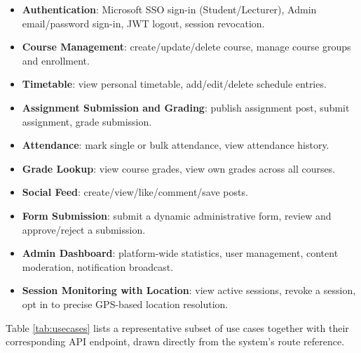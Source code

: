 \documentclass[12pt,a4paper]{report}
\begin{document}
\begin{itemize}
\item \textbf{Authentication}: Microsoft SSO sign-in (Student/Lecturer),
Admin email/password sign-in, JWT logout, session revocation.
\item \textbf{Course Management}: create/update/delete course, manage
course groups and enrollment.
\item \textbf{Timetable}: view personal timetable, add/edit/delete
schedule entries.
\item \textbf{Assignment Submission and Grading}: publish assignment
post, submit assignment, grade submission.
\item \textbf{Attendance}: mark single or bulk attendance, view
attendance history.
\item \textbf{Grade Lookup}: view course grades, view own grades across
all courses.
\item \textbf{Social Feed}: create/view/like/comment/save posts.
\item \textbf{Form Submission}: submit a dynamic administrative form,
review and approve/reject a submission.
\item \textbf{Admin Dashboard}: platform-wide statistics, user
management, content moderation, notification broadcast.
\item \textbf{Session Monitoring with Location}: view active sessions,
revoke a session, opt in to precise GPS-based location resolution.
\end{itemize}

Table \ref{tab:usecases} lists a representative subset of use cases
together with their corresponding API endpoint, drawn directly from the
system's route reference.
\end{document}
